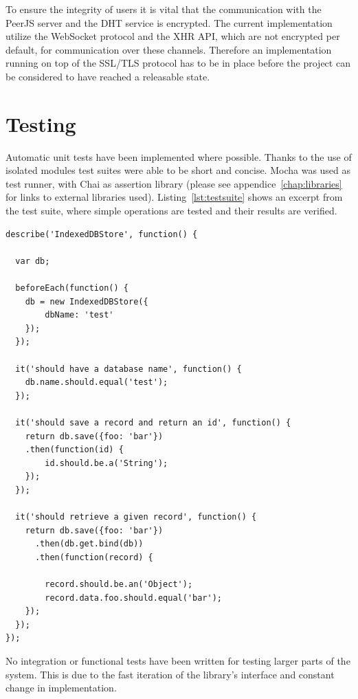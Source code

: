 To ensure the integrity of users it is vital that the communication with the PeerJS server and the DHT service is encrypted. The current implementation utilize the WebSocket protocol and the XHR API, which are not encrypted per default, for communication over these channels. Therefore an implementation running on top of the SSL/TLS protocol has to be in place before the project can be considered to have reached a releasable state.

\section{Testing}
\label{sec:testing}

Automatic unit tests have been implemented where possible. Thanks to the use of isolated modules test suites were able to be short and concise. Mocha was used as test runner, with Chai as assertion library (please see appendice~\ref{chap:libraries} for links to external libraries used). Listing~\ref{lst:testsuite} shows an excerpt from the test suite, where simple operations are tested and their results are verified.

\begin{Code}
\begin{lstlisting}[caption={Sample test suite}, label={lst:testsuite}]
describe('IndexedDBStore', function() {

  var db;

  beforeEach(function() {
  	db = new IndexedDBStore({
  		dbName: 'test'
  	});
  });

  it('should have a database name', function() {
  	db.name.should.equal('test');
  });

  it('should save a record and return an id', function() {
  	return db.save({foo: 'bar'})
  	.then(function(id) {
  		id.should.be.a('String');
  	});
  });

  it('should retrieve a given record', function() {
  	return db.save({foo: 'bar'})
      .then(db.get.bind(db))
      .then(function(record) {

  		record.should.be.an('Object');
  		record.data.foo.should.equal('bar');
  	});
  });
});
\end{lstlisting}
\end{Code}

No integration or functional tests have been written for testing larger parts of the system. This is due to the fast iteration of the library's interface and constant change in implementation.
